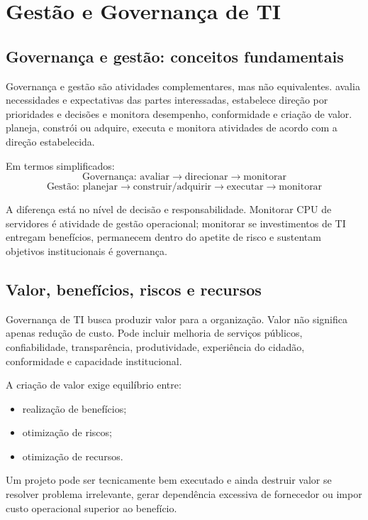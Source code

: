 \chapter{Gestão e Governança de TI}

\section{Governança e gestão: conceitos fundamentais}

Governança e gestão são atividades complementares, mas não equivalentes.  avalia necessidades e expectativas das partes interessadas, estabelece direção por prioridades e decisões e monitora desempenho, conformidade e criação de valor.  planeja, constrói ou adquire, executa e monitora atividades de acordo com a direção estabelecida.

Em termos simplificados:
\[
\text{Governança: avaliar}\rightarrow\text{direcionar}\rightarrow\text{monitorar}
\]
\[
\text{Gestão: planejar}\rightarrow\text{construir/adquirir}\rightarrow\text{executar}\rightarrow\text{monitorar}
\]

A diferença está no nível de decisão e responsabilidade. Monitorar CPU de servidores é atividade de gestão operacional; monitorar se investimentos de TI entregam benefícios, permanecem dentro do apetite de risco e sustentam objetivos institucionais é governança.

\section{Valor, benefícios, riscos e recursos}

Governança de TI busca produzir valor para a organização. Valor não significa apenas redução de custo. Pode incluir melhoria de serviços públicos, confiabilidade, transparência, produtividade, experiência do cidadão, conformidade e capacidade institucional.

A criação de valor exige equilíbrio entre:
\begin{itemize}
\item realização de benefícios;
\item otimização de riscos;
\item otimização de recursos.
\end{itemize}

Um projeto pode ser tecnicamente bem executado e ainda destruir valor se resolver problema irrelevante, gerar dependência excessiva de fornecedor ou impor custo operacional superior ao benefício.

